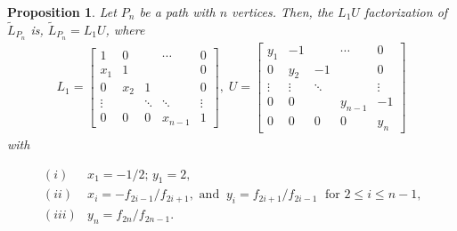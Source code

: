 \documentclass[12pt]{article}
\newtheorem{proposition}[theorem]{Proposition}
\begin{document}
\begin{proposition} Let $P_n$ be a path with $n$ vertices. Then, the $L_1U$ factorization of $\tilde{L}_{P_n}$ is, 
$\tilde{L}_{P_n} = L_1 U$, where 
\begin{eqnarray} \label{LandU}
L_1= \left[
  \begin{array}{ccccc}
  1    & 0      &            & \cdots   & 0 \\
  x_1  & 1      &            &          & 0 \\
  0    & x_2    & 1          &          & 0 \\
\vdots &        & \ddots     & \ddots   & \vdots \\
0      & 0      & 0          & x_{n-1} & 1
\end{array}
  \right], \;
U= \left[
  \begin{array}{ccccc}
  y_1    & -1      &            & \cdots     & 0 \\
  0      & y_2     & -1          &             & 0 \\
\vdots & \vdots & \ddots     &              & \vdots \\
0      & 0      &            &     y_{n-1}  &  -1\\
0      & 0      & 0          & 0            & y_n
\end{array}
  \right]
\end{eqnarray}
with 

\[
\begin{array}{ll}
 (i) & x_1  =  -1/2; \, y_1 =  2, \\
  (ii) &x_{i}=   - f_{2i-1}/f_{2i+1}, \mbox{ and} \;\; 
        y_i  =   f_{2i+1}/f_{2i-1} \;\mbox{ for $2 \leq i \leq n-1$,}\\
(iii) &y_n  =   f_{2n}/f_{2n-1}.
\end{array}
\]
%
\end{proposition}
\end{document}
